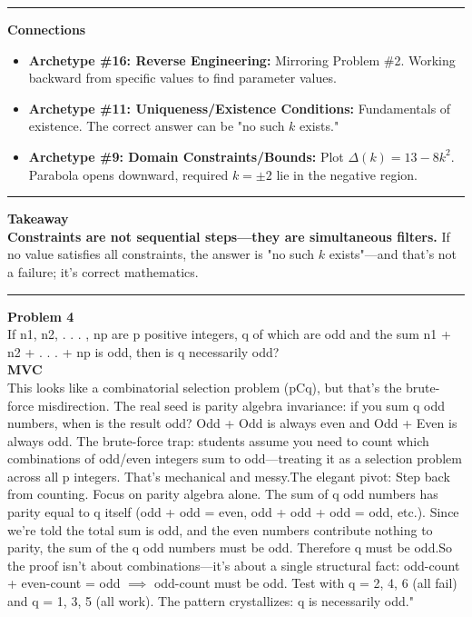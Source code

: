 \documentclass{article}
\begin{document}
\noindent \rule{\textwidth}{0.4pt}

\noindent \textbf{Connections}
\begin{itemize}
    \item \textbf{Archetype \#16: Reverse Engineering:} Mirroring Problem \#2. Working backward from specific values to find parameter values.
    \item \textbf{Archetype \#11: Uniqueness/Existence Conditions:} Fundamentals of existence. The correct answer can be "no such $k$ exists."
    \item \textbf{Archetype \#9: Domain Constraints/Bounds:} Plot $\Delta(k) = 13 - 8k^2$. Parabola opens downward, required $k = \pm 2$ lie in the negative region.
\end{itemize}

\noindent \rule{\textwidth}{0.4pt}

\noindent \textbf{Takeaway} \\

\noindent \textbf{Constraints are not sequential steps—they are simultaneous filters.} If no value satisfies all constraints, the answer is "no such $k$ exists"—and that's not a failure; it's correct mathematics.\\


\noindent \rule{\textwidth}{0.4pt}

\noindent \textbf{Problem 4} \\
If n1, n2, . . . , np are p positive integers, q of which are odd and the sum 
n1 + n2 + . . . + np is odd, then is q necessarily odd? \\

\noindent \textbf{MVC} \\

\noindent This looks like a combinatorial selection problem (pCq), but that's the brute-force misdirection. The real seed is parity algebra invariance: if you sum q odd numbers, when is the result odd? Odd + Odd is always even and Odd + Even is always odd. The brute-force trap: students assume you need to count which combinations of odd/even integers sum to odd—treating it as a selection problem across all p integers. That's mechanical and messy.The elegant pivot: Step back from counting. Focus on parity algebra alone. The sum of q odd numbers has parity equal to q itself (odd + odd = even, odd + odd + odd = odd, etc.). Since we're told the total sum is odd, and the even numbers contribute nothing to parity, the sum of the q odd numbers must be odd. Therefore q must be odd.So the proof isn't about combinations—it's about a single structural fact: odd-count + even-count = odd $\implies$ odd-count must be odd. Test with q = 2, 4, 6 (all fail) and q = 1, 3, 5 (all work). The pattern crystallizes: q is necessarily odd." \\
\end{document}
